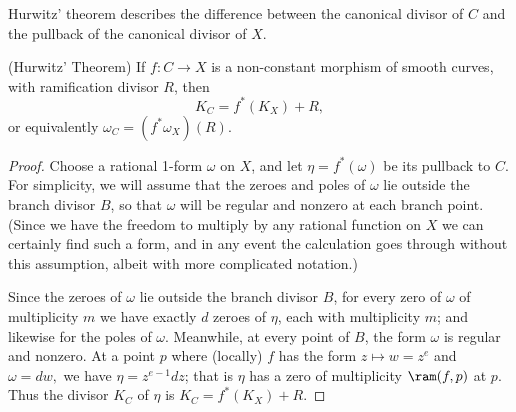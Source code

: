  Hurwitz' theorem describes the difference between the canonical divisor of $C$ and the pullback of the canonical divisor of $X$.
\begin{theorem}(Hurwitz' Theorem) \cite[Proposition IV.2.3]{H} \label{Hurwitz}
If $f:C\to X$ is a non-constant morphism of smooth curves, with ramification divisor $R$, then 
$$
K_C = f^{*}(K_{X})+R,$$
or equivalently
$
\omega_{C} = (f^{*}\omega_{X})(R).
$
\end{theorem}
 
\begin{proof}
Choose a rational 1-form $\omega$ on $X$, and let $\eta = f^*(\omega)$ be its pullback to $C$. For simplicity, we will assume that the zeroes and poles of $\omega$ lie outside the branch divisor $B$, so that $\omega$ will be regular and nonzero at each branch point. (Since we have the freedom to multiply by any rational function on $X$ we can certainly find such a form, and in any event the calculation goes through without this assumption, albeit with more complicated notation.) 

Since the zeroes of $\omega$ lie outside the branch divisor $B$, for every zero of $\omega$ of multiplicity $m$ we have exactly $d$ zeroes of $\eta$, each with multiplicity $m$; and likewise for the poles of $\omega$. Meanwhile, at every point of $B$, the form $\omega$ is regular and nonzero. At a point $p$ where (locally) $f$ has the form $z \mapsto w = z^{e}$
and $\omega = dw,$ we have $\eta = z^{e-1}dz$; that is $\eta$ has a zero of multiplicity $\ram(f,p)$ at  $p$.
Thus the divisor $K_{C}$ of $\eta$ is
$K_{C} = f^{*}(K_{X})+R$.
\end{proof}

